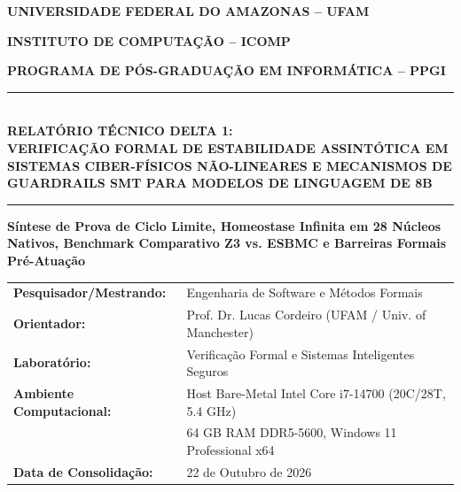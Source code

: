 \documentclass[11pt,a4paper]{article}
\theoremstyle{definition}
\begin{document}
\begin{titlepage}
    \thispagestyle{empty}
    \centering
    {\large\textbf{UNIVERSIDADE FEDERAL DO AMAZONAS -- UFAM}\par}
    {\large\textbf{INSTITUTO DE COMPUTAÇÃO -- ICOMP}\par}
    {\large\textbf{PROGRAMA DE PÓS-GRADUAÇÃO EM INFORMÁTICA -- PPGI}\par}
    \vspace{0.4cm}
    \rule{\linewidth}{1.2pt}\\[0.3cm]
    {\Large \bfseries \color{ufamblue} RELATÓRIO TÉCNICO DELTA 1:\\[0.2cm]
    VERIFICAÇÃO FORMAL DE ESTABILIDADE ASSINTÓTICA EM SISTEMAS CIBER-FÍSICOS NÃO-LINEARES E MECANISMOS DE GUARDRAILS SMT PARA MODELOS DE LINGUAGEM DE 8B}\\[0.3cm]
    \rule{\linewidth}{1.2pt}
    
    \vspace{0.3cm}
    {\normalsize \textbf{Síntese de Prova de Ciclo Limite, Homeostase Infinita em 28 Núcleos Nativos, Benchmark Comparativo Z3 vs. ESBMC e Barreiras Formais Pré-Atuação}\par}
    
    \vspace{0.5cm}
    \begin{minipage}{0.92\textwidth}
        \small
        \begin{tabular}{ll}
            \textbf{Pesquisador/Mestrando:} & Engenharia de Software e Métodos Formais \\
            \textbf{Orientador:} & Prof. Dr. Lucas Cordeiro (UFAM / Univ. of Manchester) \\
            \textbf{Laboratório:} & Verificação Formal e Sistemas Inteligentes Seguros \\
            \textbf{Ambiente Computacional:} & Host Bare-Metal Intel Core i7-14700 (20C/28T, 5.4 GHz) \\
            & 64 GB RAM DDR5-5600, Windows 11 Professional x64 \\
            \textbf{Data de Consolidação:} & 22 de Outubro de 2026
        \end{tabular}
    \end{minipage}
    

\end{titlepage}
\end{document}
